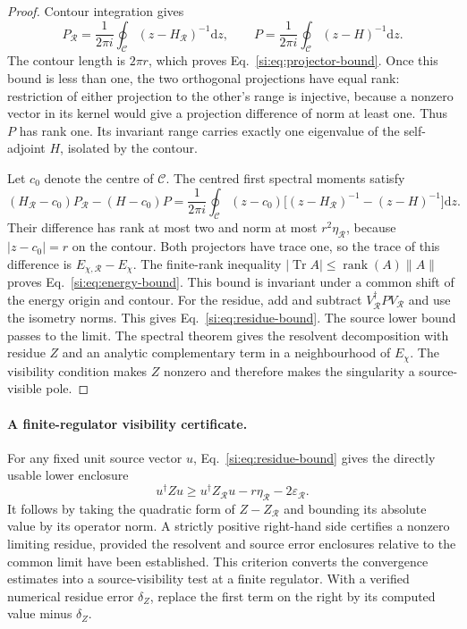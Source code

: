 \documentclass[11pt,a4paper]{article}
\newcommand{\dd}{\mathrm{d}}\DeclareMathOperator{\Tr}{Tr}
\begin{document}
\begin{proof}
Contour integration gives
\[
P_{\mathcal R}=\frac1{2\pi i}\oint_{\mathcal C}(z-H_{\mathcal R})^{-1}\dd z,
\qquad
P=\frac1{2\pi i}\oint_{\mathcal C}(z-H)^{-1}\dd z.
\]
The contour length is $2\pi r$, which proves Eq.~\eqref{si:eq:projector-bound}. Once this bound is less than one, the two orthogonal projections have equal rank: restriction of either projection to the other's range is injective, because a nonzero vector in its kernel would give a projection difference of norm at least one. Thus $P$ has rank one. Its invariant range carries exactly one eigenvalue of the self-adjoint $H$, isolated by the contour.

Let $c_0$ denote the centre of $\mathcal C$. The centred first spectral moments satisfy
\[
(H_{\mathcal R}-c_0)P_{\mathcal R}-(H-c_0)P
=\frac1{2\pi i}\oint_{\mathcal C}(z-c_0)\bigl[(z-H_{\mathcal R})^{-1}-(z-H)^{-1}\bigr]\dd z.
\]
Their difference has rank at most two and norm at most $r^2\eta_{\mathcal R}$, because $|z-c_0|=r$ on the contour. Both projectors have trace one, so the trace of this difference is $E_{\chi,\mathcal R}-E_\chi$. The finite-rank inequality $|\Tr A|\leq\operatorname{rank}(A)\|A\|$ proves Eq.~\eqref{si:eq:energy-bound}. This bound is invariant under a common shift of the energy origin and contour. For the residue, add and subtract $V_{\mathcal R}^\dagger PV_{\mathcal R}$ and use the isometry norms. This gives Eq.~\eqref{si:eq:residue-bound}. The source lower bound passes to the limit. The spectral theorem gives the resolvent decomposition with residue $Z$ and an analytic complementary term in a neighbourhood of $E_\chi$. The visibility condition makes $Z$ nonzero and therefore makes the singularity a source-visible pole.
\end{proof}

\paragraph{A finite-regulator visibility certificate.}
For any fixed unit source vector $u$, Eq.~\eqref{si:eq:residue-bound} gives the directly usable lower enclosure
\begin{equation}\label{si:eq:visibility-certificate}
u^\dagger Zu\geq
u^\dagger Z_{\mathcal R}u-r\eta_{\mathcal R}-2\varepsilon_{\mathcal R}.
\end{equation}
It follows by taking the quadratic form of $Z-Z_{\mathcal R}$ and bounding its absolute value by its operator norm. A strictly positive right-hand side certifies a nonzero limiting residue, provided the resolvent and source error enclosures relative to the common limit have been established. This criterion converts the convergence estimates into a source-visibility test at a finite regulator. With a verified numerical residue error $\delta_Z$, replace the first term on the right by its computed value minus $\delta_Z$.
\end{document}
